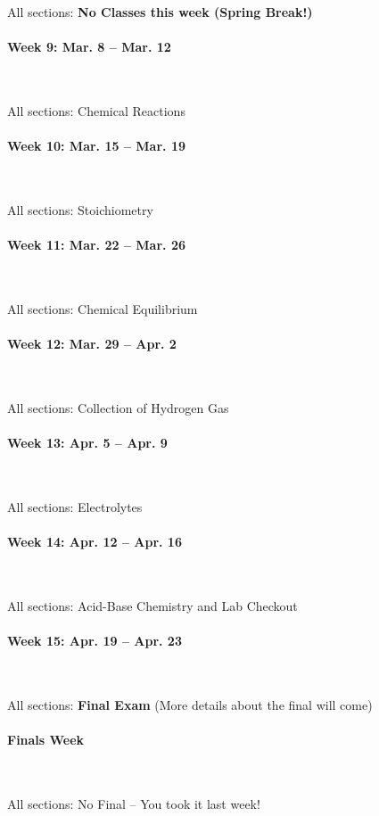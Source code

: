 \documentclass[12pt, letterpaper]{article}
\begin{document}
All sections: \textbf{No Classes this week (Spring Break!)}

\paragraph{Week 9: Mar. 8 -- Mar. 12}~

All sections: Chemical Reactions

\paragraph{Week 10: Mar. 15 -- Mar. 19}~

All sections: Stoichiometry

\paragraph{Week 11: Mar. 22 -- Mar. 26}~

All sections: Chemical Equilibrium

\paragraph{Week 12: Mar. 29 -- Apr. 2}~ 

All sections: Collection of Hydrogen Gas

\paragraph{Week 13: Apr. 5 -- Apr. 9}~

All sections: Electrolytes

\paragraph{Week 14: Apr. 12 -- Apr. 16}~

All sections: Acid-Base Chemistry and Lab Checkout

\paragraph{Week 15: Apr. 19 -- Apr. 23}~

All sections: \textbf{Final Exam} (More details about the final will come)

\paragraph{Finals Week}~

All sections: No Final -- You took it last week!
\end{document}
